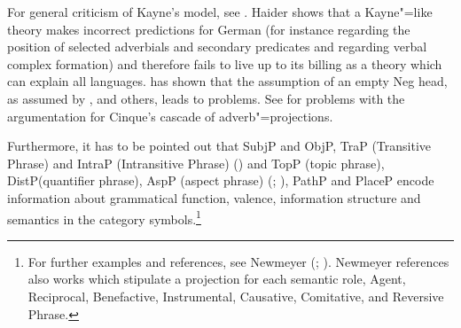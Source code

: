 For general criticism of Kayne's model, see . Haider shows that a Kayne"=like
theory makes incorrect predictions for German (for instance regarding the position of selected
adverbials and secondary predicates and regarding verbal complex formation) and therefore fails to live up to its billing as a theory which
can explain all languages. \citet[Section~4]{Haider97a} has shown that the assumption of an empty Neg head,
as assumed by \citet{Pollock89a-u}, \citet{Haegeman95a-u} and others, leads to problems. See
 for problems with the argumentation for Cinque's cascade of adverb"=projections.

Furthermore, it has to be pointed out that SubjP and ObjP, TraP (Transitive
Phrase) and IntraP (Intransitive Phrase) (\citealp[]{Karimi-Doostan2005a}) and
TopP (topic phrase), DistP\linebreak (quantifier
phrase), AspP (aspect phrase) (\citealp[]{EKiss2003a-u}; \citealp[]{Karimi2005a}), PathP and PlaceP
\citep[]{Svenonius2004a-u} encode information about grammatical function, valence,
information structure and semantics in the category symbols.\footnote{%
	For further examples and references, see Newmeyer (\citeyear[]{Newmeyer2004b};
  \citeyear[]{Newmeyer2005a}). Newmeyer references also works which stipulate a projection
  for each semantic role, \eg Agent, Reciprocal, Benefactive, Instrumental, Causative,
  Comitative, and Reversive Phrase.
}
%
